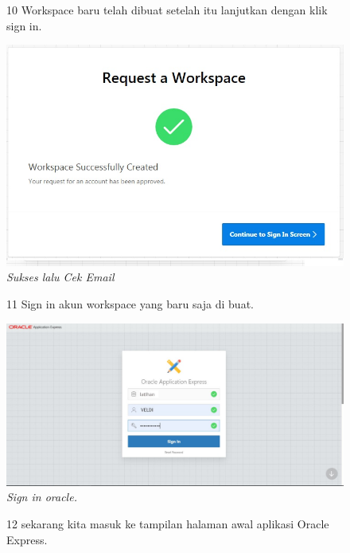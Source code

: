 \begin{enumerate}
\begin{figure}
\item[10] Workspace baru telah dibuat setelah itu lanjutkan dengan klik sign in.

    \begin{center}
\includegraphics[scale=0.5]{figures/pict(5).jpg}
    \caption{\textit{Sukses lalu Cek Email}}
        \end{center}
\label{gambar}
\end{figure}

\begin{figure}
\item[11] Sign in akun workspace yang baru saja di buat.

    \begin{center}
\includegraphics[scale=0.5]{figures/apex.jpeg}
    \caption{\textit{Sign in oracle.}}
        \end{center}
\label{gambar}
\end{figure}

\begin{figure}
\item[12] sekarang kita masuk ke tampilan halaman awal aplikasi Oracle Express.


\end{figure}
\end{enumerate}

